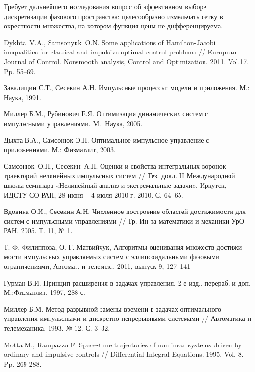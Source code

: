 \documentclass[a4paper,12pt]{article}
\begin{document}
Требует дальнейшего исследования вопрос об эффективном выборе дискретизации
фазового пространства:  целесообразно измельчать сетку в окрестности множества,
на котором функция цены не дифференцируема.
\pagebreak
\begin{thebibliography}{99}

     { Dykhta~V.A., Samsonyuk~O.N.}  Some applications of
        Hamilton-Jacobi inequalities for classical and impulsive optimal
        control problems // European Journal of Control. Nonsmooth analysis,
        Control and Optimization. 2011. Vol.17. Pp. 55--69.

     { Завалищин С.Т., Сесекин А.Н.}  {Импульсные
        процессы: модели и приложения}.  М.: Наука, 1991.

     { Миллер Б.М., Рубинович Е.Я.}  { Оптимизация
        динамических систем с импульсными управлениями}.  М.: Наука, 2005.

     { Дыхта В.А., Самсонюк О.Н.}  Оптимальное импульсное
        управление с приложениями.  М.: Физматлит, 2003.

     { Самсонюк~О.Н., Сесекин~А.Н.} Оценки и свойства
        интегральных воронок траекторий нелинейных импульсных систем //
        Тез. докл. II Международной школы-семинара «Нелинейный анализ и
        экстремальные задачи». Иркутск, ИДСТУ СО РАН, 28 июня -- 4 июля 2010
        г. 2010. С. 64--65.

     Вдовина О.И., Сесекин А.Н. Численное построение
        областей достижимости для систем с импульсными управлениями //
        Тр. Ин-та математики и механики УрО РАН.  2005. Т. 11, № 1.

     Т. Ф. Филиппова, О. Г. Матвийчук, Алгоритмы
        оценивания множеств достижи- мости импульсных управляемых систем с
        эллипсоидальными фазовыми ограничениями, Автомат. и телемех.,
        2011, выпуск 9, 127–141

     Гурман В.И. Принцип расширения в задачах
        управления. 2-е изд., перераб. и доп. М.:Физматлит, 1997, 288 с.

     Миллер Б.М. Метод разрывной замены времени в задачах
        оптимального управления импульсными и дискретно-непрерывными
        системами // Автоматика и телемеханика. 1993. № 12. С. 3--32.

     Motta M., Rampazzo F. Space-time trajectories of
        nonlinear systems driven by ordinary and impulsive controls //
        Differential Integral Equations. 1995. Vol. 8.  Pp. 269-288.


\end{thebibliography}
\end{document}
